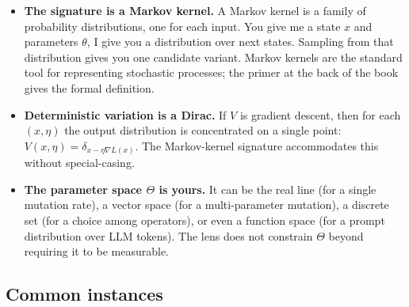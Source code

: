 \begin{itemize}[leftmargin=1.5em,itemsep=2pt]
  \item \textbf{The signature is a Markov kernel.} A Markov kernel is a
    family of probability distributions, one for each input. You give
    me a state $x$ and parameters $\theta$, I give you a distribution
    over next states. Sampling from that distribution gives you one
    candidate variant. Markov kernels are the standard tool for
    representing stochastic processes; the primer at the back of the
    book gives the formal definition.
  \item \textbf{Deterministic variation is a Dirac.} If $V$ is gradient
    descent, then for each $(x, \eta)$ the output distribution is
    concentrated on a single point: $V(x, \eta) = \delta_{x - \eta
    \nabla L(x)}$. The Markov-kernel signature accommodates this
    without special-casing.
  \item \textbf{The parameter space $\Theta$ is yours.} It can be the
    real line (for a single mutation rate), a vector space (for a
    multi-parameter mutation), a discrete set (for a choice among
    operators), or even a function space (for a prompt distribution
    over LLM tokens). The lens does not constrain $\Theta$ beyond
    requiring it to be measurable.
\end{itemize}

\subsection*{Common instances}

